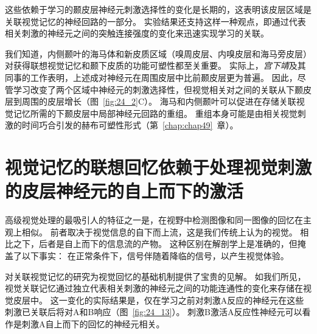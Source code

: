 这些依赖于学习的颞皮层神经元刺激选择性的变化是长期的，这表明该皮层区域是关联视觉记忆的神经回路的一部分。
实验结果还支持这样一种观点，即通过代表相关刺激的神经元之间的突触连接强度的变化来迅速实现学习的关联。


我们知道，内侧颞叶的海马体和新皮质区域（嗅周皮层、内嗅皮层和海马旁皮层）对获得联想视觉记忆和颞下皮质的功能可塑性都至关重要。
实际上，\textit{宫下靖}及其同事的工作表明，上述成对神经元在周围皮层中比前颞皮层更为普遍。
因此，尽管学习改变了两个区域中神经元的刺激选择性，但视觉相关对之间的关联从下颞皮层到周围的皮层增长（图~\ref{fig:24_2}C）。
海马和内侧颞叶可以促进在存储关联视觉记忆所需的下颞皮层中局部神经元回路的重组。
重组本身可能是由相关视觉刺激的时间巧合引发的赫布可塑性形式（第~\ref{chap:chap49}~章）。



\section{视觉记忆的联想回忆依赖于处理视觉刺激的皮层神经元的自上而下的激活}

高级视觉处理的最吸引人的特征之一是，在视野中检测图像和同一图像的回忆在主观上相似。
前者取决于视觉信息的自下而上流，这是我们传统上认为的视觉。
相比之下，后者是自上而下的信息流的产物。
这种区别在解剖学上是准确的，但掩盖了以下事实：
在正常条件下，信号伴随着降临的信号，以产生视觉体验。


对关联视觉记忆的研究为视觉回忆的基础机制提供了宝贵的见解。
如我们所见，视觉关联记忆通过独立代表相关刺激的神经元之间的功能连通性的变化来存储在视觉皮层中。
这一变化的实际结果是，仅在学习之前对刺激A反应的神经元在这些刺激已关联后将对A和B响应（图~\ref{fig:24_13}）。
刺激B激活A反应性神经元可以看作是刺激A自上而下的回忆的神经元相关。


